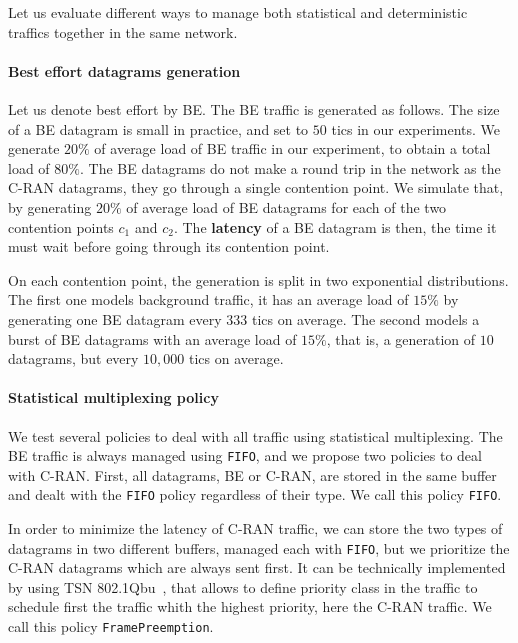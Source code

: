 \documentclass[a4paper,10pt]{article}
\newcommand\FIFO{\texttt{FIFO}\xspace}
\newcommand\framepre{\texttt{FramePreemption}\xspace}
\begin{document}
    Let us evaluate different ways to manage both statistical and deterministic traffics together in the same network.
 
    \paragraph{Best effort datagrams generation}
    
    Let us denote best effort by BE. The BE traffic is generated as follows. The size of a BE datagram is small in practice, and set to $50$ tics in our experiments. We generate $20\%$ of average load of BE traffic in our experiment, to obtain a total load of $80\%$. The BE datagrams do not make a round trip
    in the network as the C-RAN datagrams, they go through a single contention point. 
    We simulate that, by generating $20\%$ of average load of BE datagrams for each of the two contention points $c_1$ and $c_2$. The \textbf{latency} of a BE datagram is then, the time it must wait before going
    through its contention point.

    On each contention point, the generation is split in two exponential distributions. The first one models 
    background traffic, it has an average load of $15\%$ by generating one BE datagram every $333$ tics on average. The second models a burst of BE datagrams with an average load of $15\%$, that is, a generation of $10$ datagrams, but every $10,000$ tics on average. 
   
   	\paragraph{Statistical multiplexing policy}

   	We test several policies to deal with all traffic using statistical multiplexing.
   	The BE traffic is always managed using \FIFO, and we propose two policies to deal with C-RAN. First, all datagrams, BE or C-RAN, are stored in the same buffer and dealt with the \FIFO policy regardless of their type. We call this policy \FIFO.

    In order to minimize the latency of C-RAN traffic, we can store the two types of datagrams in two different buffers, managed each with \FIFO, but we prioritize the C-RAN datagrams which are always sent first. It can be technically implemented by using TSN 802.1Qbu~\cite{ieee802}, that allows to define priority class in the traffic to schedule first the traffic whith the highest priority, here the C-RAN traffic. We call this policy \framepre.
    
\end{document}
